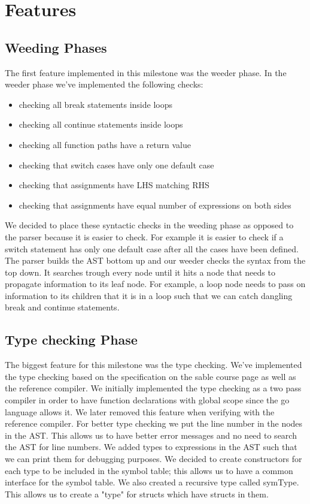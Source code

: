 \documentclass{article}
\begin{document}
\section{Features}

\subsection{Weeding Phases}
The first feature implemented in this milestone was the weeder phase. In the weeder phase we've implemented the following checks:
\begin{itemize}
\item checking all break statements inside loops
\item checking all continue statements inside loops
\item checking all function paths have a return value
\item checking that switch cases have only one default case
\item checking that assignments have LHS matching RHS
\item checking that assignments have equal number of expressions on both sides
\end{itemize}

We decided to place these syntactic checks in the weeding phase as opposed to the parser because it is easier to check. For example it is easier to check if  a switch statement has only one default case after all the cases have been defined. The parser builds the AST bottom up and our weeder checks the syntax from the top down. It searches trough every node until it hits a node that needs to propagate information to its leaf node. For example, a loop node needs to pass on information to its children that it is in a loop such that we can catch dangling break and continue statements. 

\subsection{Type checking Phase}
The biggest feature for this milestone was the type checking. We've implemented the type checking based on the specification on the sable course page as well as the reference compiler. We initially implemented the type checking as a two pass compiler in order to have function declarations with global scope since the go language allows it. We later removed this feature when verifying with the reference compiler. For better type checking we put the line number in the nodes in the AST. This allows us to have better error messages and no need to search the AST for line numbers.  We added types to expressions in the AST such that we can print them for debugging purposes. We decided to create constructors for each type to be included in the symbol table; this allows us to have a common interface for the symbol table. We also created a recursive type called symType. This allows us to create a "type" for structs which have structs in them.
\end{document}

